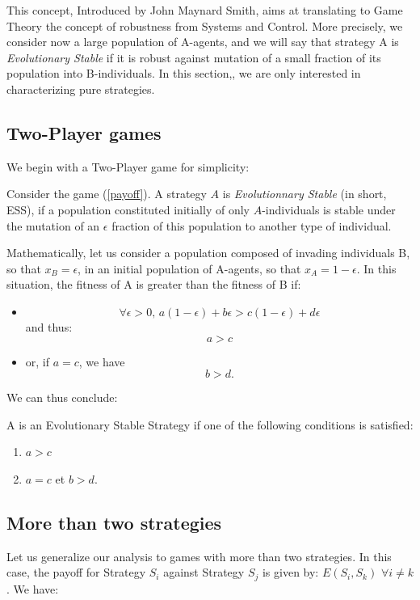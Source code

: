 This concept, Introduced by John Maynard Smith, aims at translating to Game Theory the concept of robustness from Systems and Control.  More precisely, we consider now a large population of A-agents, and we will say that strategy A is \emph{Evolutionary Stable} if it is robust against mutation of a small fraction of its population into B-individuals.
In this section,, we are only interested in characterizing pure strategies.
\subsection{Two-Player games}

We begin with a Two-Player game for simplicity:
\begin{definition}
Consider the game (\ref{payoff}).  A strategy $A$ is \emph{Evolutionnary Stable} (in short, ESS), if a population constituted initially of only $A$-individuals is stable under the mutation of an $\epsilon$ fraction of this population to another type of individual.
\end{definition}
Mathematically, let us consider a population composed of invading individuals B, so that   $x_B=\epsilon$, in an initial population of A-agents, so that $x_A=1 - \epsilon$. In this situation, the fitness of A is greater than the fitness of B if:
\begin{itemize}
\item \begin{equation}
\forall \epsilon>0, \, a(1-\epsilon) + b \epsilon > c(1-\epsilon)+d\epsilon \label{inegalite}
\end{equation}
and thus:
\begin{equation}
a > c
\end{equation}
\item or, if
$a=c$, we have
\begin{equation}
b>d.
\end{equation}
\end{itemize}
We can thus conclude:

\begin{proposition} A is an Evolutionary Stable Strategy if one of the following conditions is satisfied:
\begin{enumerate}
\item $a>c$
\item $a=c$ et $b>d.$
\end{enumerate}
\end{proposition}
\subsection{More than two strategies}
Let us generalize our analysis to games with more than two strategies.  In this case, the payoff for Strategy $S_i$ against Strategy $S_j$ is given by: $E(S_i,S_k)$ $\forall i \neq k$. We have:

